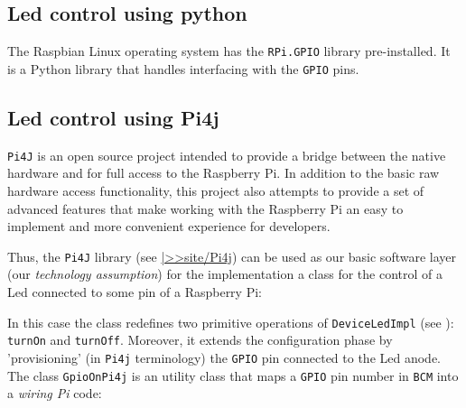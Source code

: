 

\subsection{Led control using python}
The Raspbian Linux operating system  has the \texttt{RPi.GPIO} library pre-installed. It is a Python library that handles interfacing with the \texttt{GPIO} pins.



 \subsection{Led control using Pi4j}
\texttt{Pi4J} is an open source project  intended to provide a bridge between the native hardware and \java{} for full access to the Raspberry Pi. In addition to the basic raw hardware access functionality, this project also attempts to provide a set of advanced features that make working with the Raspberry Pi an easy to implement and more convenient experience for \java{} developers.

Thus, the \texttt{Pi4J} library (see \href{https://137.204.107.21/syskb/it.unibo.iss2015intro/docs/Raspberry/pi4j.html}{|>>site/Pi4j}) can be used as our basic software layer (our \textit{technology assumption}) for the implementation a \java{} class for the control of a Led connected to some pin of a Raspberry Pi:



In this case the class redefines two primitive operations of \texttt{DeviceLedImpl} (see ): \texttt{turnOn} and \texttt{turnOff}. Moreover, it extends the configuration phase by 'provisioning' (in \texttt{Pi4j} terminology) the \texttt{GPIO} pin connected to the Led anode. 
%
The class \texttt{GpioOnPi4j} is an utility class that maps a \texttt{GPIO} pin number in \texttt{BCM}  into a \textit{wiring Pi} code:



